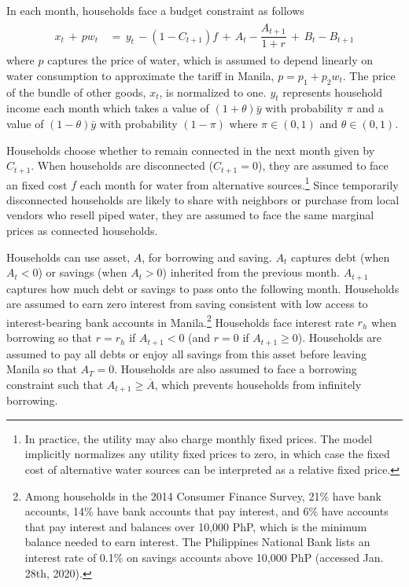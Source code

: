 \documentclass[12pt,table]{article}
\begin{document}

In each month, households face a budget constraint as follows
\begin{align}\label{eq:bc}
\begin{split}
x_t \, + \, p w_t \, &= \, y_t \, - (1-C_{t+1})f  \, + \,  A_t  - \dfrac{A_{t+1}}{1+r}   \, + \,  B_t - B_{t+1} 
\end{split}
\end{align}
where $p$ captures the price of water, which is assumed to depend linearly on water consumption to approximate the tariff in Manila, $p=p_1+p_2w_t$.   The price of the bundle of other goods, $x_t$, is normalized to one.  $y_t$ represents household income each month which takes a value of $(1+\theta)\bar{y}$ with probability $\pi$ and a value of $(1-\theta)\bar{y}$ with probability $(1-\pi)$ where $\pi \in (0,1)$ and $\theta  \in (0,1)$.  

Households choose whether to remain connected in the next month given by $C_{t+1}$.  When households are disconnected ($C_{t+1}=0$), they are assumed to face an fixed cost $f$ each month for water from alternative sources.\footnote{In practice, the utility may also charge monthly fixed prices.  The model implicitly normalizes any utility fixed prices to zero, in which case the fixed cost of alternative water sources can be interpreted as a relative fixed price.}  Since temporarily disconnected households are likely to share with neighbors or purchase from local vendors who resell piped water, they are assumed to face the same marginal prices as connected households.

Households can use asset, $A$, for borrowing and saving.  $A_t$ captures debt (when $A_t<0$) or savings (when $A_t>0$) inherited from the previous month.  $A_{t+1}$ captures how much debt or savings to pass onto the following month.  Households are assumed to earn zero interest from saving consistent with low access to interest-bearing bank accounts in Manila.\footnote{Among households in the 2014 Consumer Finance Survey, 21\% have bank accounts, 14\% have bank accounts that pay interest, and 6\% have accounts that pay interest and balances over 10,000 PhP, which is the minimum balance needed to earn interest.  The Philippines National Bank lists an interest rate of 0.1\% on savings accounts above 10,000 PhP (accessed Jan. 28th, 2020).} Households face interest rate $r_h$ when borrowing so that  $r=r_h$ if $A_{t+1}<0$ (and $r = 0$ if $A_{t+1}\geq 0$).  Households are assumed to pay all debts or enjoy all savings from this asset before leaving Manila so that $A_{T}=0$.  Households are also assumed to face a borrowing constraint such that $A_{t+1}\geq\overline{A}$, which prevents households from infinitely borrowing.
\end{document}
